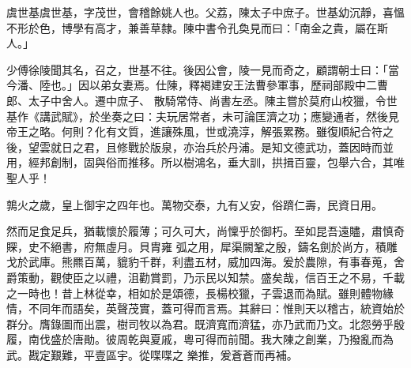 
\begin{pinyinscope}

 虞世基虞世基，字茂世，會稽餘姚人也。父荔，陳太子中庶子。世基幼沉靜，喜慍不形於色，博學有高才，兼善草隸。陳中書令孔奐見而曰：「南金之貴，屬在斯人。」



 少傅徐陵聞其名，召之，世基不往。後因公會，陵一見而奇之，顧謂朝士曰：「當今潘、陸也。」因以弟女妻焉。仕陳，釋褐建安王法曹參軍事，歷祠部殿中二曹郎、太子中舍人。遷中庶子、
 散騎常侍、尚書左丞。陳主嘗於莫府山校獵，令世基作《講武賦》，於坐奏之曰：夫玩居常者，未可論匡濟之功；應變通者，然後見帝王之略。何則？化有文質，進讓殊風，世或澆淳，解張累務。雖復順紀合符之後，望雲就日之君，且修戰於版泉，亦治兵於丹浦。是知文德武功，蓋因時而並用，經邦創制，固與俗而推移。所以樹鴻名，垂大訓，拱揖百靈，包舉六合，其唯聖人乎！



 鶉火之歲，皇上御宇之四年也。萬物交泰，九有乂安，俗躋仁壽，民資日用。



 然而足食足兵，猶載懷於履薄；可久可大，尚懍乎於御朽。至如昆吾遠贐，肅慎奇賝，史不絕書，府無虛月。貝胄雍
 弧之用，犀渠闕鞏之殷，鑄名劍於尚方，積雕戈於武庫。熊羆百萬，貔豹千群，利盡五材，威加四海。爰於農隙，有事春蒐，舍爵策動，觀使臣之以禮，沮勸賞罰，乃示民以知禁。盛矣哉，信百王之不易，千載之一時也！昔上林從幸，相如於是頌德，長楊校獵，子雲退而為賦。雖則體物緣情，不同年而語矣，英聲茂實，蓋可得而言焉。其辭曰：惟則天以稽古，統資始於群分。膺錄圖而出震，樹司牧以為君。既濟寬而濟猛，亦乃武而乃文。北怨勞乎殷履，南伐盛於唐勛。彼周乾與夏戚，粵可得而前聞。我大陳之創業，乃撥亂而為武。戡定艱難，平壹區宇。從喋喋之
 樂推，爰蒼蒼而再補。




\end{pinyinscope}
